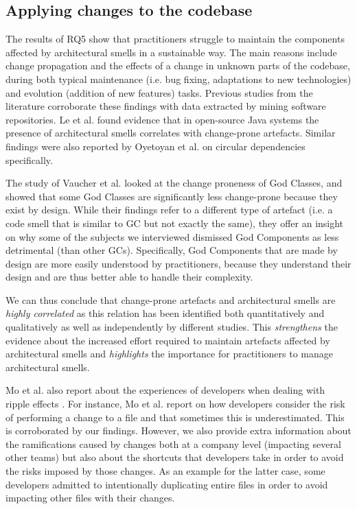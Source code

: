 \subsection{Applying changes to the codebase}
The results of RQ5 show that practitioners struggle to maintain the components affected by architectural smells in a sustainable way. The main reasons include change propagation and the effects of a change in unknown parts of the codebase, during both typical maintenance (i.e. bug fixing, adaptations to new technologies) and evolution (addition of new features) tasks.
Previous studies from the literature corroborate these findings with data extracted by mining software repositories. Le et al. \cite{Le2018} found evidence that in open-source Java systems the presence of architectural smells correlates with change-prone artefacts. Similar findings were also reported by Oyetoyan et al. \cite{Oyetoyan2015} on circular dependencies specifically.

The study of Vaucher et al. \cite{Vaucher2009} looked at the change proneness of God Classes, and showed that some God Classes are significantly less change-prone because they exist by design. 
While their findings refer to a different type of artefact (i.e. a code smell that is similar to GC but not exactly the same), they offer an insight on why some of the subjects we interviewed dismissed God Components as less detrimental (than other GCs). Specifically, God Components that are made by design are more easily understood by practitioners, because they understand their design and are thus better able to handle their complexity. 

We can thus conclude that change-prone artefacts and architectural smells are \emph{highly correlated} as this relation has been identified both quantitatively and qualitatively as well as independently by different studies.
This \emph{strengthens} the evidence about the increased effort required to maintain artefacts affected by architectural smells and \emph{highlights} the importance for practitioners to manage architectural smells.

Mo et al. also report about the experiences of developers when dealing with ripple effects \cite{Mo2018}. For instance, Mo et al. report on how developers consider the risk of performing a change to a file and that sometimes this is underestimated. This is corroborated by our findings. However, we also provide extra information about the ramifications caused by changes both at a company level (impacting several other teams) but also about the shortcuts that developers take in order to avoid the risks imposed by those changes.
As an example for the latter case, some developers admitted to intentionally duplicating entire files in order to avoid impacting other files with their changes.

